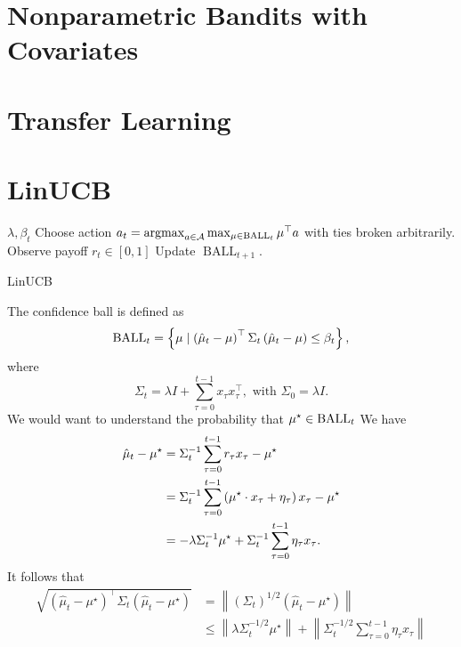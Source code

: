 \documentclass[letterpaper,11pt]{article}
\begin{document}
\section{Nonparametric Bandits with Covariates}









\section{Transfer Learning}



\section{LinUCB}

\begin{algorithm}[H]
\begin{algorithmic}[1]
\REQUIRE $\lambda, \beta_t$
\STATE Choose action $a_t=\operatorname{argmax}_{a \in \mathcal{A}} \max _{\mu \in \operatorname{BALL}_t} \mu^\top a$ with ties broken arbitrarily. 
\STATE Observe payoff $r_t \in [0, 1]$
\STATE Update $\operatorname{BALL}_{t+1}$. 
\ENDFOR
\end{algorithmic}
\caption{LinUCB}
\label{alg:seq}
\end{algorithm}

The confidence ball is defined as 
\begin{equation*}
\operatorname{BALL}_{t} = \left\{ \mu \mid \left(\hat{\mu}_t - \mu\right)^\top \Sigma_t \left(\hat{\mu}_t - \mu\right) \leq \beta_t\right\},
\end{equation*}
where 
$$
\Sigma_t=\lambda I+\sum_{\tau=0}^{t-1} x_\tau x_\tau^{\top}, \text { with } \Sigma_0=\lambda I.
$$
We would want to understand the probability that $\mu^\star \in \operatorname{BALL}_{t}$
We have
\begin{equation*}
\begin{aligned}
    \hat{\mu}_{t} - \mu^\star &= \Sigma_t^{-1} \sum_{\tau=0}^{t-1} r_\tau x_\tau - \mu^\star\\
    &= \Sigma_t^{-1} \sum_{\tau=0}^{t-1} \left(\mu^\star \cdot x_{\tau} + \eta_{\tau}\right) x_\tau - \mu^\star\\
    &= - \lambda \Sigma_t^{-1} \mu^\star + \Sigma_t^{-1} \sum_{\tau=0}^{t-1} \eta_{\tau} x_{\tau}.
\end{aligned}
\end{equation*}
It follows that 
\begin{equation*}
\begin{aligned}
\sqrt{\left(\widehat{\mu}_t-\mu^{\star}\right)^{\top} \Sigma_t\left(\widehat{\mu}_t-\mu^{\star}\right)} & =\left\|\left(\Sigma_t\right)^{1 / 2}\left(\widehat{\mu}_t-\mu^{\star}\right)\right\| \\
& \leq\left\|\lambda \Sigma_t^{-1 / 2} \mu^{\star}\right\|+\left\|\Sigma_t^{-1 / 2} \sum_{\tau=0}^{t-1} \eta_\tau x_\tau\right\|
\end{aligned}
\end{equation*}
\end{document}
